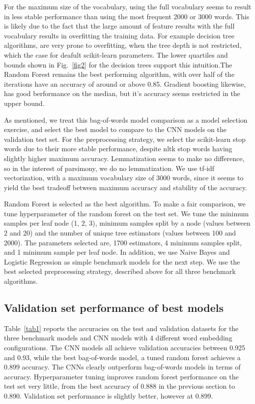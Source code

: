 \documentclass[conference]{IEEEtran}
\begin{document}
For the maximum size of the vocabulary, using the full vocabulary seems to result in less stable performance than using the most frequent 2000 or 3000 words. This is likely due to the fact that the large amount of feature results with the full vocabulary results in overfitting the training data. For example decision tree algorithms, are very prone to overfitting, when the tree depth is not restricted, which the case for deafult scikit-learn parameters. The lower quartiles and bounds shown in Fig.~\ref{fig2} for the decision trees support this intuition.The Random Forest remains the best performing algorithm, with over half of the iterations have an accuracy of around or above 0.85. Gradient boosting  likewise, has good berformance on the median, but it's accuracy seems restricted in the upper bound.

As mentioned, we treat this  bag-of-words model comparison as a model selection exercise, and select the best model to compare to the CNN models on the validation test set. For the preprocessing strategy, we select the scikit-learn stop words due to their more stable performance, despite nltk stop words having slightly higher maximum accuracy. Lemmatization seems to make no difference, so in the interest of parsimony, we do no lemmatization. We use tf-idf vectorization, with a maximum vocabulary size of 3000 words, since it seems to yield the best tradeoff between maximum accuracy and stability of the accuracy.

Random Forest is selected as the best algorithm. To make a fair comparison, we tune hyperparameter of the random forest on the test set. We tune the minimum samples per leaf node (1, 2, 3), minimum samples split by a node (values between 2 and 20) and the number of unique tree estimators (values between 100 and 2000). The parameters selected are, 1700 estimators, 4 minimum samples split, and 1 minimum sample per leaf node. In addition, we use Naive Bayes and Logistic Regression as simple benchmark models for the next step. We use the best selected preprocessing strategy, described above for all three benchmark algorithms.

\subsection{Validation set performance of best models}

Table~\ref{tab1} reports the accuracies on the test and validation datasets for the three benchmark models and CNN models with 4 different word embedding configurations. The CNN models all achieve validation accuracies between 0.925 and 0.93, while the best bag-of-words model, a tuned random forest achieves a 0.899 accuracy. The CNNs clearly outperform bag-of-words models in terms of accuracy. Hyperparameter tuning improves random forest performance on the test set very little, from the best accuracy of 0.888 in the previous section to 0.890. Validation set performance is slightly better, however at 0.899.
\end{document}
